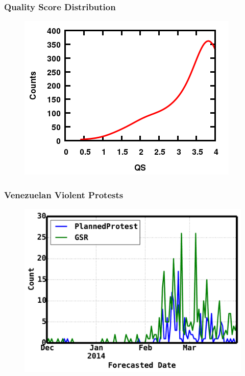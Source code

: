 \documentclass[red,handout]{beamer}
\begin{document}
\begin{frame}[noframenumbering]
    \frametitle{Quality Score Distribution}
    \centering
    \begin{figure}
        \includegraphics[scale=0.6]{doubleHump}
    \end{figure}
\end{frame}

\begin{frame}[noframenumbering]
    \frametitle{Venezuelan Violent Protests}
     \begin{figure}
        \centering
        \includegraphics[scale=0.4]{venezuela_violent}
     \end{figure}
\end{frame}
\end{document}
